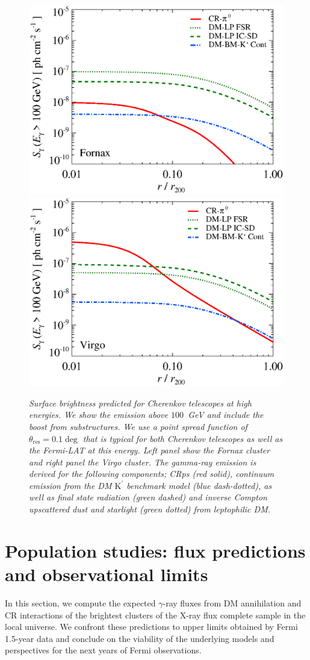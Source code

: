 \documentclass[10pt,aps,pra,reprint,amsmath,amsfonts,amssymb,showpacs]{revtex4-1}
\newcommand{\rmn}{\mathrm}
\newcommand{\psf}{\theta_\rmn{res}}
\newcommand{\Kp}{\rmn{K}^\prime}
\begin{document}
\begin{figure}
\begin{minipage}{2.0\columnwidth}
  \includegraphics[width=0.49\columnwidth]{figures/SB.Fornax.v10.SF300.SubMass.elmu.eps}
  \includegraphics[width=0.49\columnwidth]{figures/SB.Virgo.v10.SF300.SubMass.elmu.eps}
\caption{\it Surface brightness predicted for Cherenkov telescopes at
  high energies. We show the emission above $100$~GeV and include the
  boost from substructures. We use a point spread function of
  $\psf=0.1\deg$ that is typical for both Cherenkov
  telescopes as well as the Fermi-LAT at this energy. Left panel show
  the Fornax cluster and right panel the Virgo cluster. The gamma-ray
  emission is derived for the following components; CRps (red solid),
  continuum emission from the DM $\Kp$ benchmark model (blue
  dash-dotted), as well as final state radiation (green dashed) and
  inverse Compton upscattered dust and starlight (green dotted) from
  leptophilic DM.}
 \label{fig:SB_IACTs}
\end{minipage}
\end{figure}



\section{Population studies: flux predictions and observational limits}


In this section, we compute the expected $\gamma$-ray fluxes from DM
annihilation and CR interactions of the brightest clusters of the X-ray flux
complete sample in the local universe. We confront these predictions to upper
limits obtained by Fermi 1.5-year data and conclude on the viability of the
underlying models and perspectives for the next years of Fermi observations.
\end{document}
